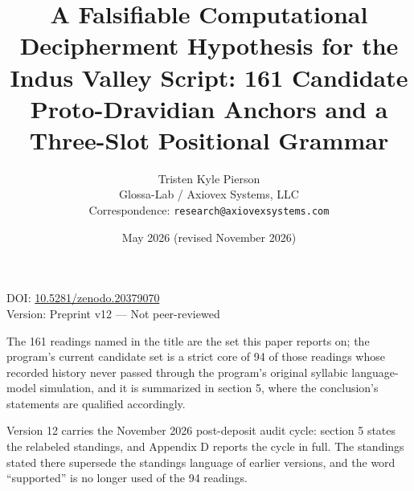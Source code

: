 \documentclass[11pt]{article}
\title{A Falsifiable Computational Decipherment Hypothesis for the Indus Valley Script: 161 Candidate Proto-Dravidian Anchors and a Three-Slot Positional Grammar}
\author{Tristen Kyle Pierson\\
Glossa-Lab / Axiovex Systems, LLC\\
Correspondence: \texttt{research@axiovexsystems.com}}
\date{May 2026 (revised November 2026)}
\begin{document}
\maketitle

DOI: \href{https://doi.org/10.5281/zenodo.20379070}{10.5281/zenodo.20379070}\\
Version: Preprint v12 --- Not peer-reviewed

The 161 readings named in the title are the set this paper reports on; the program's current candidate set is a strict core of 94 of those readings whose recorded history never passed through the program's original syllabic language-model simulation, and it is summarized in section 5, where the conclusion's statements are qualified accordingly.

Version 12 carries the November 2026 post-deposit audit cycle: section 5 states the relabeled standings, and Appendix D reports the cycle in full. The standings stated there supersede the standings language of earlier versions, and the word ``supported'' is no longer used of the 94 readings.
\end{document}
